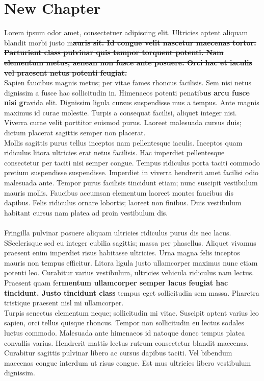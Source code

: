 \documentclass{article}
\begin{document}
\section{\textnormal{New \textbf{Chapter}}}
Lorem ipsum odor amet, consectetuer adipiscing elit. Ultricies aptent aliquam blandit morbi justo m\textbf{\sout{auris sit. Id congue velit nascetur maecenas tortor. Parturient class pulvinar quis tempor torquent potenti. Nam elementum metus, aenean non fusce ante posuere. Orci hac et iaculis vel praesent netus potenti feugiat.}}\\Sapien faucibus magnis metus; per vitae fames rhoncus facilisis. Sem nisi netus dignissim a fusce hac sollicitudin in. Himenaeos potenti penatib\textbf{us arcu fusce nisi gr}avida elit. Dignissim ligula cursus suspendisse mus a tempus. Ante magnis maximus id curae molestie. Turpis a consequat facilisi, aliquet integer nisi. Viverra curae velit porttitor euismod purus. Laoreet malesuada cursus duis; dictum placerat sagittis semper non placerat.\\Mollis sagittis purus tellus inceptos nam pellentesque iaculis. Inceptos quam ridiculus litora ultricies erat netus facilisis. Hac imperdiet pellentesque consectetur per taciti nisi semper congue. Tempus ridiculus porta taciti commodo pretium suspendisse suspendisse. Imperdiet in viverra hendrerit amet facilisi odio malesuada ante. Tempor purus facilisis tincidunt etiam; nunc suscipit vestibulum mauris mollis. Faucibus accumsan elementum laoreet montes faucibus dis dapibus. Felis ridiculus ornare lobortis; laoreet non finibus. Duis vestibulum habitant cursus nam platea ad proin vestibulum dis.\\\\Fringilla pulvinar posuere aliquam ultricies ridiculus purus dis nec lacus. SScelerisque sed eu integer cubilia sagittis; massa per phasellus. Aliquet vivamus praesent enim imperdiet risus habitasse ultricies. Urna magna felis inceptos mauris non tempus efficitur. Litora ligula justo ullamcorper maximus nunc etiam potenti leo. Curabitur varius vestibulum, ultricies vehicula ridiculus nam lectus. Praesent quam fe\textbf{rmentum ullamcorper semper lacus feugiat hac tincidunt. Justo tincidunt class} tempus eget sollicitudin sem massa. Pharetra tristique praesent nisl mi ullamcorper.\\Turpis senectus elementum neque; sollicitudin mi vitae. Suscipit aptent varius leo sapien, orci tellus quisque rhoncus. Tempor non sollicitudin eu lectus sodales luctus commodo. Malesuada ante himenaeos id natoque donec tempus platea convallis varius. Hendrerit mattis lectus rutrum consectetur blandit maecenas. Curabitur sagittis pulvinar libero ac cursus dapibus taciti. Vel bibendum maecenas congue interdum ut risus congue. Est mus ultricies libero vestibulum dignissim.\\
\end{document}

